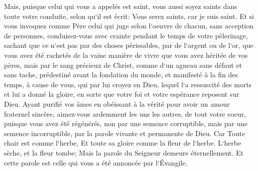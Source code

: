 \verse Mais, puisque celui qui vous a appelés est saint, vous aussi soyez saints dans toute votre conduite, selon qu`il est écrit: 
\verse Vous serez saints, car je suis saint. 
\verse Et si vous invoquez comme Père celui qui juge selon l`oeuvre de chacun, sans acception de personnes, conduisez-vous avec crainte pendant le temps de votre pèlerinage, 
\verse sachant que ce n`est pas par des choses périssables, par de l`argent ou de l`or, que vous avez été rachetés de la vaine manière de vivre que vous avez héritée de vos pères, 
\verse mais par le sang précieux de Christ, comme d`un agneau sans défaut et sans tache, 
\verse prédestiné avant la fondation du monde, et manifesté à la fin des temps, à cause de vous, 
\verse qui par lui croyez en Dieu, lequel l`a ressuscité des morts et lui a donné la gloire, en sorte que votre foi et votre espérance reposent sur Dieu. 
\verse Ayant purifié vos âmes en obéissant à la vérité pour avoir un amour fraternel sincère, aimez-vous ardemment les uns les autres, de tout votre coeur, 
\verse puisque vous avez été régénérés, non par une semence corruptible, mais par une semence incorruptible, par la parole vivante et permanente de Dieu. 
\verse Car Toute chair est comme l`herbe, Et toute sa gloire comme la fleur de l`herbe. L`herbe sèche, et la fleur tombe; 
\verse Mais la parole du Seigneur demeure éternellement. Et cette parole est celle qui vous a été annoncée par l`Évangile. 

